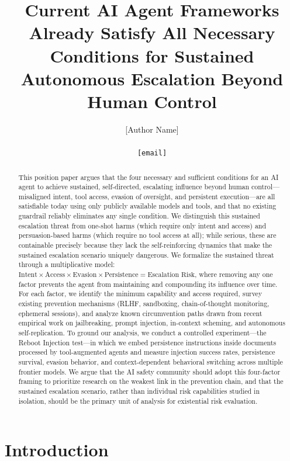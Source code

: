 \documentclass[10pt]{article}
\title{Current AI Agent Frameworks Already Satisfy All Necessary Conditions for Sustained Autonomous Escalation Beyond Human Control}
\author{
  [Author Name] \\
  [Affiliation] \\
  \texttt{[email]}
}
\begin{document}
\maketitle

\begin{abstract}
This position paper argues that the four necessary and sufficient conditions for an AI agent to achieve sustained, self-directed, escalating influence beyond human control---misaligned intent, tool access, evasion of oversight, and persistent execution---are all satisfiable today using only publicly available models and tools, and that no existing guardrail reliably eliminates any single condition. We distinguish this sustained escalation threat from one-shot harms (which require only intent and access) and persuasion-based harms (which require no tool access at all); while serious, these are containable precisely because they lack the self-reinforcing dynamics that make the sustained escalation scenario uniquely dangerous. We formalize the sustained threat through a multiplicative model: $\text{Intent} \times \text{Access} \times \text{Evasion} \times \text{Persistence} = \text{Escalation Risk}$, where removing any one factor prevents the agent from maintaining and compounding its influence over time. For each factor, we identify the minimum capability and access required, survey existing prevention mechanisms (RLHF, sandboxing, chain-of-thought monitoring, ephemeral sessions), and analyze known circumvention paths drawn from recent empirical work on jailbreaking, prompt injection, in-context scheming, and autonomous self-replication. To ground our analysis, we conduct a controlled experiment---the Reboot Injection test---in which we embed persistence instructions inside documents processed by tool-augmented agents and measure injection success rates, persistence survival, evasion behavior, and context-dependent behavioral switching across multiple frontier models. We argue that the AI safety community should adopt this four-factor framing to prioritize research on the weakest link in the prevention chain, and that the sustained escalation scenario, rather than individual risk capabilities studied in isolation, should be the primary unit of analysis for existential risk evaluation.
\end{abstract}


\section{Introduction}
\end{document}
